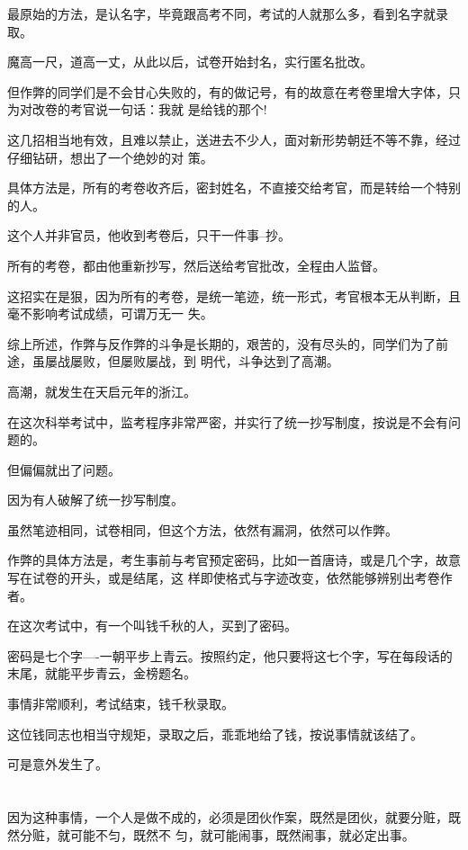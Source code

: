 \documentclass[11pt,a4paper,onecolumn]{article}
\begin{document}
最原始的方法，是认名字，毕竟跟高考不同，考试的人就那么多，看到名字就录取。

魔高一尺，道高一丈，从此以后，试卷开始封名，实行匿名批改。

但作弊的同学们是不会甘心失败的，有的做记号，有的故意在考卷里增大字体，只为对改卷的考官说一句话：我就
是给钱的那个!

这几招相当地有效，且难以禁止，送进去不少人，面对新形势朝廷不等不靠，经过仔细钻研，想出了一个绝妙的对
策。

具体方法是，所有的考卷收齐后，密封姓名，不直接交给考官，而是转给一个特别的人。

这个人并非官员，他收到考卷后，只干一件事--抄。

所有的考卷，都由他重新抄写，然后送给考官批改，全程由人监督。

这招实在是狠，因为所有的考卷，是统一笔迹，统一形式，考官根本无从判断，且毫不影响考试成绩，可谓万无一
失。

综上所述，作弊与反作弊的斗争是长期的，艰苦的，没有尽头的，同学们为了前途，虽屡战屡败，但屡败屡战，到
明代，斗争达到了高潮。

高潮，就发生在天启元年的浙江。

在这次科举考试中，监考程序非常严密，并实行了统一抄写制度，按说是不会有问题的。

但偏偏就出了问题。

因为有人破解了统一抄写制度。

虽然笔迹相同，试卷相同，但这个方法，依然有漏洞，依然可以作弊。

作弊的具体方法是，考生事前与考官预定密码，比如一首唐诗，或是几个字，故意写在试卷的开头，或是结尾，这
样即使格式与字迹改变，依然能够辨别出考卷作者。

在这次考试中，有一个叫钱千秋的人，买到了密码。

密码是七个字----一朝平步上青云。按照约定，他只要将这七个字，写在每段话的末尾，就能平步青云，金榜题名。

事情非常顺利，考试结束，钱千秋录取。

这位钱同志也相当守规矩，录取之后，乖乖地给了钱，按说事情就该结了。

可是意外发生了。

\section[\thesection]{}

因为这种事情，一个人是做不成的，必须是团伙作案，既然是团伙，就要分赃，既然分赃，就可能不匀，既然不
匀，就可能闹事，既然闹事，就必定出事。
\end{document}
